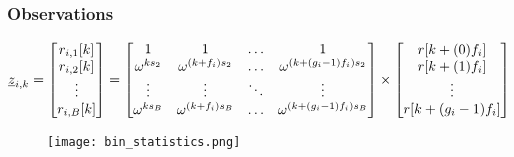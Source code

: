 \begin{frame}\frametitle{Observations}
\begin{align} \nonumber
	    		\underline{z}_{i,k} = \begin{bmatrix}
	    		r_{i,1}[k]\\
	    		r_{i,2}[k]\\
	    		\vdots\\
	    		r_{i,B}[k]
	    		\end{bmatrix}			
            = \begin{bmatrix}
			1 & 1 & \ldots & 1 \\
			\omega^{k s_2} & \omega^{(k+f_i) s_2} & \ldots & \omega^{(k+(g_i-1)f_i) s_2}   \\
			\vdots & \vdots & \ddots & \vdots\\
			\omega^{k s_B} & \omega^{(k+f_i) s_B} & \ldots & \omega^{(k+(g_i-1)f_i) s_B} \\
			\end{bmatrix} \times
			\begin{bmatrix}
			r[k+(0)f_i] \\
			r[k+(1)f_i] \\
			\vdots\\
			r[k+(g_i-1)f_i]
			\end{bmatrix}
			\end{align}

			\begin{figure}[t]
			\begin{center}
				\texttt{[image: bin\_statistics.png]}
			\end{center}
		\end{figure}

\end{frame}

